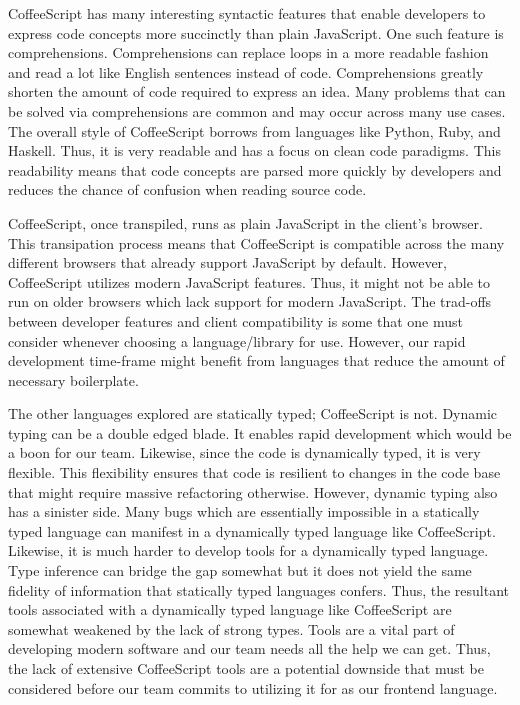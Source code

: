 \documentclass[12pt]{report}
\begin{document}
CoffeeScript has many interesting syntactic features that enable developers to express code concepts more succinctly than plain JavaScript. One such feature is comprehensions.\cite{coffeescriptguide} Comprehensions can replace loops in a more readable fashion and read a lot like English sentences instead of code. Comprehensions greatly shorten the amount of code required to express an idea. Many problems that can be solved via comprehensions are common and may occur across many use cases. The overall style of CoffeeScript borrows from languages like Python, Ruby, and Haskell. Thus, it is very readable and has a focus on clean code paradigms. This readability means that code concepts are parsed more quickly by developers and reduces the chance of confusion when reading source code.

CoffeeScript, once transpiled, runs as plain JavaScript in the client's browser.\cite{coffeescriptguide} This transipation process means that CoffeeScript is compatible across the many different browsers that already support JavaScript by default. However, CoffeeScript utilizes modern JavaScript features.\cite{coffeescriptguide} Thus, it might not be able to run on older browsers which lack support for modern JavaScript. The trad-offs between developer features and client compatibility is some that one must consider whenever choosing a language/library for use. However, our rapid development time-frame might benefit from languages that reduce the amount of necessary boilerplate.

The other languages explored are statically typed; CoffeeScript is not. Dynamic typing can be a double edged blade. It enables rapid development which would be a boon for our team. Likewise, since the code is dynamically typed, it is very flexible. This flexibility ensures that code is resilient to changes in the code base that might require massive refactoring otherwise. However, dynamic typing also has a sinister side. Many bugs which are essentially impossible in a statically typed language can manifest in a dynamically typed language like CoffeeScript. Likewise, it is much harder to develop tools for a dynamically typed language. Type inference can bridge the gap somewhat but it does not yield the same fidelity of information that statically typed languages confers. Thus, the resultant tools associated with a dynamically typed language like CoffeeScript are somewhat weakened by the lack of strong types. Tools are a vital part of developing modern software and our team needs all the help we can get. Thus, the lack of extensive CoffeeScript tools are a potential downside that must be considered before our team commits to utilizing it for as our frontend language.
\end{document}
